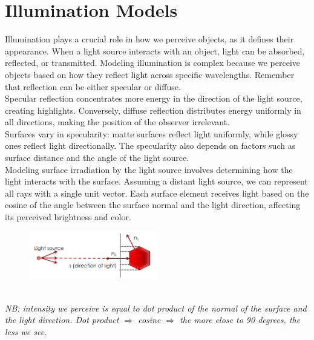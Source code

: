 \section{Illumination Models}
Illumination plays a crucial role in how we perceive objects, as it defines their appearance. 
When a light source interacts with an object, light can be absorbed, reflected, or transmitted. 
Modeling illumination is complex because we perceive objects based on how they reflect light across specific wavelengths. 
Remember that reflection can be either specular or diffuse.
\\
Specular reflection concentrates more energy in the direction of the light source, creating highlights. 
Conversely, diffuse reflection distributes energy uniformly in all directions, making the position of the observer irrelevant. 
\\Surfaces vary in specularity: matte surfaces reflect light uniformly, while glossy ones reflect light directionally. 
The specularity also depends on factors such as surface distance and the angle of the light source.
\\
Modeling surface irradiation by the light source involves determining how the light interacts with the surface. 
Assuming a distant light source, we can represent all rays with a single unit vector. 
Each surface element receives light based on the cosine of the angle between the surface normal and the light direction, affecting its perceived brightness and color.
\begin{figure}[h]
    \centering
    \includegraphics[width=0.5\textwidth]{Figures/Illumination.png}
\end{figure}
\\\textit{NB: intensity we perceive is equal to dot product of the normal of the surface and the light direction. Dot product $\Rightarrow$ cosine $\Rightarrow$ the more close to 90 degrees, the less we see.}

